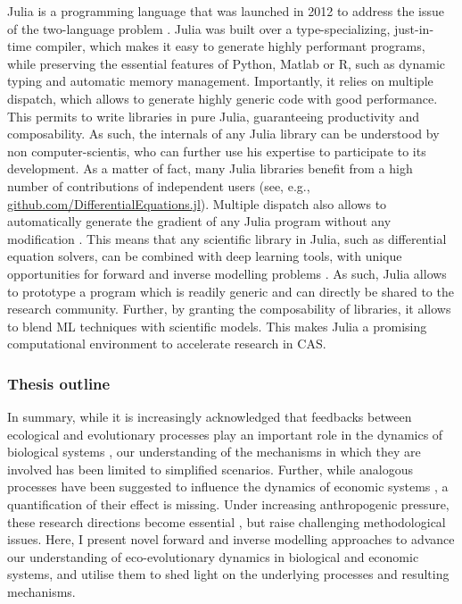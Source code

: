 Julia is a programming language that was launched in 2012 to address the issue of the two-language problem \cite{Bezanson2017,Bezanson2018}. Julia was built over a type-specializing, just-in-time compiler, which makes it easy to generate highly performant programs, while preserving the essential features of Python, Matlab or R, such as dynamic typing and automatic memory management.
% 
Importantly, it relies on multiple dispatch, which allows to generate highly generic code with good performance. This permits to write libraries in pure Julia, guaranteeing productivity and composability.
% 
% 
As such, the internals of any Julia library can be understood by non computer-scientis, who can further use his expertise to participate to its development. As a matter of fact, many Julia libraries benefit from a high number of contributions of independent users (see, e.g., \href{github.com/DifferentialEquations.jl}{github.com/DifferentialEquations.jl}).
% 
Multiple dispatch also allows to automatically generate the gradient of any Julia program without any modification \cite{ForwardDiff.jl, Zygote.jl}. This means that any scientific library in Julia, such as differential equation solvers, can be combined with deep learning tools, with unique opportunities for forward and inverse modelling problems \cite{Frank2022}. 
% 
% 
As such, Julia allows to prototype a program which is readily generic and can directly be shared to the research community. Further, by granting the composability of libraries, it allows to blend ML techniques with scientific models. This makes Julia a promising computational environment to accelerate research in CAS. 

\subsubsection*{Thesis outline}

In summary, while it is increasingly acknowledged that feedbacks between ecological and evolutionary processes play an important role in the dynamics of biological systems \cite{Pelletier2009, Urban2016}, our understanding of the mechanisms in which they are involved has been limited to simplified scenarios.
% 
Further, while analogous processes have been suggested to influence the dynamics of economic systems \cite{Hodgson2019}, a quantification of their effect is missing.
%
Under increasing anthropogenic pressure, these research directions become essential \cite{Urban2016}, but raise challenging methodological issues.
% 
Here, I present novel forward and inverse modelling approaches to advance our understanding of eco-evolutionary dynamics in biological and economic systems, and utilise them to shed light on the underlying processes and resulting mechanisms.



